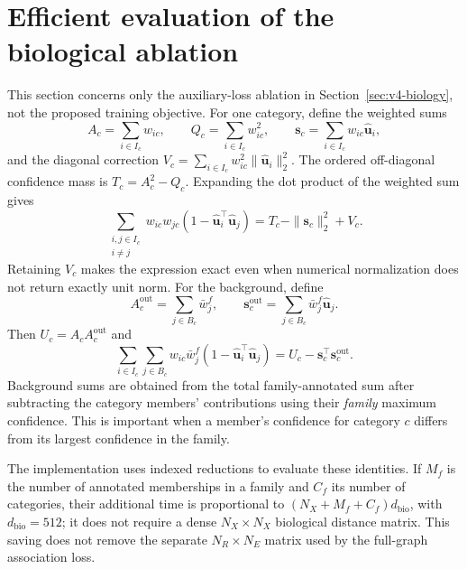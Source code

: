 \section{Efficient evaluation of the biological ablation}
\label{app:v4-efficient-bio}
This section concerns only the auxiliary-loss ablation in
Section~\ref{sec:v4-biology}, not the proposed training objective.
For one category, define the weighted sums
\begin{equation}
  A_c=\sum_{i\in I_c}w_{ic},\qquad
  Q_c=\sum_{i\in I_c}w_{ic}^{2},\qquad
  \mathbf{s}_c=\sum_{i\in I_c}w_{ic}\hat{\mathbf{u}}_i,
\end{equation}
and the diagonal correction
$V_c=\sum_{i\in I_c}w_{ic}^{2}\|\hat{\mathbf{u}}_i\|_2^2$.
The ordered off-diagonal confidence mass is $T_c=A_c^2-Q_c$. Expanding the
dot product of the weighted sum gives
\begin{equation}
  \sum_{\substack{i,j\in I_c\\i\ne j}}
      w_{ic}w_{jc}(1-\hat{\mathbf{u}}_i^\top\hat{\mathbf{u}}_j)
       =T_c-\|\mathbf{s}_c\|_2^2+V_c.
  \label{eq:v4-category-sum}
\end{equation}
Retaining $V_c$ makes the expression exact even when numerical normalization
does not return exactly unit norm. For the background, define
\begin{equation}
  A_c^{\mathrm{out}}=\sum_{j\in B_c}\bar w_j^f,\qquad
  \mathbf{s}_c^{\mathrm{out}}=\sum_{j\in B_c}\bar w_j^f\hat{\mathbf{u}}_j.
\end{equation}
Then $U_c=A_c A_c^{\mathrm{out}}$ and
\begin{equation}
  \sum_{i\in I_c}\sum_{j\in B_c}
      w_{ic}\bar w_j^f(1-\hat{\mathbf{u}}_i^\top\hat{\mathbf{u}}_j)
       =U_c-\mathbf{s}_c^\top \mathbf{s}_c^{\mathrm{out}}.
  \label{eq:v4-background-sum}
\end{equation}
Background sums are obtained from the total family-annotated sum after
subtracting the category members' contributions using their \emph{family}
maximum confidence. This is important when a member's confidence for category
$c$ differs from its largest confidence in the family.

The implementation uses indexed reductions to evaluate these identities.
If $M_f$ is the number of annotated memberships in a family and $C_f$ its
number of categories, their additional time is proportional to
$(N_X+M_f+C_f)d_{\mathrm{bio}}$, with $d_{\mathrm{bio}}=512$; it does not require a
dense $N_X\times N_X$ biological distance matrix. This saving does not remove
the separate $N_R\times N_E$ matrix used by the full-graph association loss.

